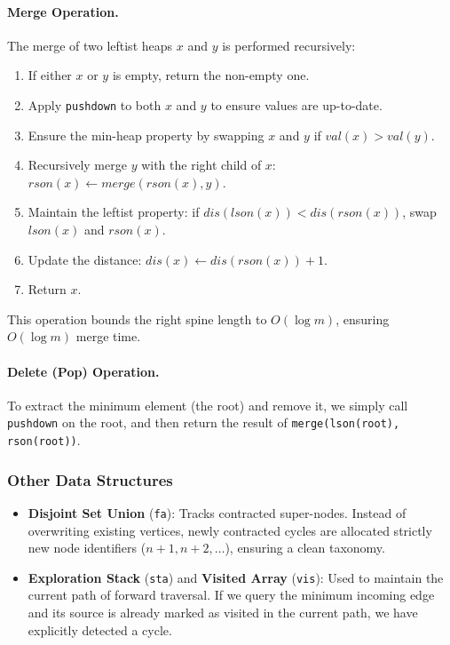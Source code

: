 \documentclass[UTF8, a4paper]{article}
\theoremstyle{definition}
\begin{document}
\paragraph{Merge Operation.} The merge of two leftist heaps $x$ and $y$ is performed recursively:
\begin{enumerate}
    \item If either $x$ or $y$ is empty, return the non-empty one.
    \item Apply \texttt{pushdown} to both $x$ and $y$ to ensure values are up-to-date.
    \item Ensure the min-heap property by swapping $x$ and $y$ if $val(x) > val(y)$.
    \item Recursively merge $y$ with the right child of $x$: $rson(x) \gets merge(rson(x), y)$.
    \item Maintain the leftist property: if $dis(lson(x)) < dis(rson(x))$, swap $lson(x)$ and $rson(x)$.
    \item Update the distance: $dis(x) \gets dis(rson(x)) + 1$.
    \item Return $x$.
\end{enumerate}
This operation bounds the right spine length to $O(\log m)$, ensuring $O(\log m)$ merge time.

\paragraph{Delete (Pop) Operation.} To extract the minimum element (the root) and remove it, we simply call \texttt{pushdown} on the root, and then return the result of \texttt{merge(lson(root), rson(root))}.

\subsubsection{Other Data Structures}

\begin{itemize}
    \item \textbf{Disjoint Set Union} (\texttt{fa}): Tracks contracted super-nodes. Instead of overwriting existing vertices, newly contracted cycles are allocated strictly new node identifiers ($n+1, n+2, \dots$), ensuring a clean taxonomy.
    \item \textbf{Exploration Stack} (\texttt{sta}) and \textbf{Visited Array} (\texttt{vis}): Used to maintain the current path of forward traversal. If we query the minimum incoming edge and its source is already marked as visited in the current path, we have explicitly detected a cycle.
\end{itemize}
\end{document}
